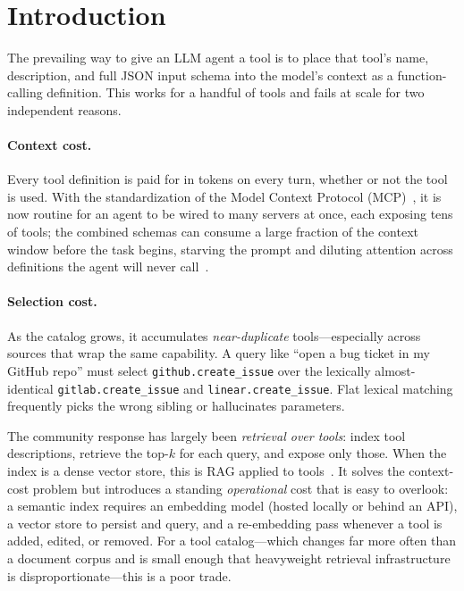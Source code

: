 \documentclass[11pt]{article}
\begin{document}
\section{Introduction}

The prevailing way to give an LLM agent a tool is to place that tool's name,
description, and full JSON input schema into the model's context as a
function-calling definition. This works for a handful of tools and fails at
scale for two independent reasons.

\paragraph{Context cost.} Every tool definition is paid for in tokens on every
turn, whether or not the tool is used. With the standardization of the Model
Context Protocol (MCP)~\citep{mcp}, it is now routine for an agent to be wired to
many servers at once, each exposing tens of tools; the combined schemas can
consume a large fraction of the context window before the task begins, starving
the prompt and diluting attention across definitions the agent will never
call~\citep{liu2023lost}.

\paragraph{Selection cost.} As the catalog grows, it accumulates
\emph{near-duplicate} tools---especially across sources that wrap the same
capability. A query like ``open a bug ticket in my GitHub repo'' must select
\texttt{github.create\_issue} over the lexically almost-identical
\texttt{gitlab.create\_issue} and \texttt{linear.create\_issue}. Flat lexical
matching frequently picks the wrong sibling or hallucinates parameters.

The community response has largely been \emph{retrieval over tools}: index tool
descriptions, retrieve the top-$k$ for each query, and expose only those. When
the index is a dense vector store, this is RAG applied to
tools~\citep{patil2023gorilla,qin2023toolllm}. It solves the context-cost
problem but introduces a standing \emph{operational} cost that is easy to
overlook: a semantic index requires an embedding model (hosted locally or behind
an API), a vector store to persist and query, and a re-embedding pass whenever a
tool is added, edited, or removed. For a tool catalog---which changes far more
often than a document corpus and is small enough that heavyweight retrieval
infrastructure is disproportionate---this is a poor trade.
\end{document}
